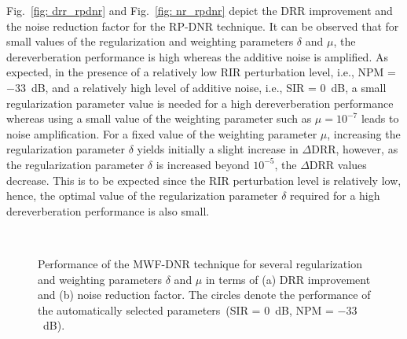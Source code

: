 \documentclass[draftcls,onecolumn,11pt]{IEEEtran}
\begin{document}
Fig.~\ref{fig: drr_rpdnr} and Fig.~\ref{fig: nr_rpdnr} depict the DRR improvement and the noise reduction factor for the RP-DNR technique.
It can be observed that for small values of the regularization and weighting parameters $\delta$ and $\mu$, the dereverberation performance is high whereas the additive noise is amplified.
As expected, in the presence of a relatively low RIR perturbation level, i.e., NPM = $-33$~dB, and a relatively high level of additive noise, i.e., SIR = $0$~dB, a small regularization parameter value is needed for a high dereverberation performance whereas using a small value of the weighting parameter such as $\mu = 10^{-7}$ leads to noise amplification.
For a fixed value of the weighting parameter $\mu$, increasing the regularization parameter $\delta$ yields initially a slight increase in $\Delta$DRR, however, as the regularization parameter $\delta$ is increased beyond $10^{-5}$, the $\Delta$DRR values decrease.
This is to be expected since the RIR perturbation level is relatively low, hence, the optimal value of the regularization parameter $\delta$ required for a high dereverberation performance is also small.
\begin{figure}[b!]
\centering
\hbox{\subfloat[\label{fig: drr_mwfdnr}]{%

}
\subfloat[\label{fig: nr_mwfdnr}]{%

}}
\caption{Performance of the MWF-DNR technique for several regularization and weighting parameters $\delta$ and $\mu$ in terms of (a) DRR improvement and (b) noise reduction factor. The circles denote the performance of the automatically selected parameters~(SIR = $0$~dB, NPM = $-33$~dB).}
\label{fig: mwfdnr}
\end{figure}
\end{document}

